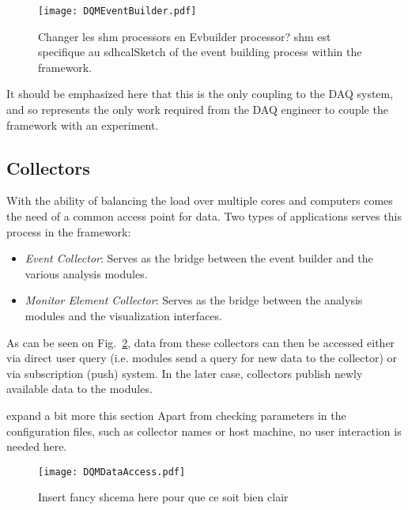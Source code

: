 \documentclass[conference]{IEEEtran}
\begin{document}
\begin{figure}[htbp]
  \begin{center}
    \texttt{[image: DQMEventBuilder.pdf]}
    \caption{\label{fig:DQMEventBuilder} {\color{red} Changer les shm processors en Evbuilder processor? shm est specifique au sdhcal}Sketch of the event building process within the framework.}
  \end{center}
\end{figure}

It should be emphasized here that this is the only coupling to the DAQ system, and so represents the only work required from the DAQ engineer to couple the framework with an experiment.



\subsection{Collectors}
With the ability of balancing the load over multiple cores and computers comes the need of a common access point for data. Two types of applications serves this process in the framework:
\begin{itemize}
    \item \emph{Event Collector}: Serves as the bridge between the event builder and the various analysis modules.

    \item \emph{Monitor Element Collector}: Serves as the bridge between the analysis modules and the visualization interfaces.
\end{itemize}

As can be seen on Fig.~\ref{fig:DQMDataAccess}, data from these collectors can then be accessed either via direct user query (i.e. modules send a query for new data to the collector) or via subscription ({\color{red}push}) system. In the later case, collectors publish newly available data to the modules.

{\color{red}expand a bit more this section}
Apart from checking parameters in the configuration files, such as collector names or host machine, no user interaction is needed here.

\begin{figure}[htbp]
  \begin{center}
    \texttt{[image: DQMDataAccess.pdf]}
    \caption{\label{fig:DQMDataAccess} \color{red}Insert fancy shcema here pour que ce soit bien clair}
  \end{center}
\end{figure}
\end{document}
